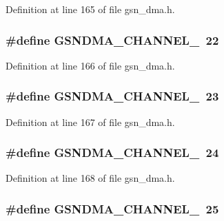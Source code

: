 Definition at line 165 of file gsn\_\-dma.h.

\hypertarget{a00484_a95f0b82527fdf9419ba78afedde7606f}{
\subsubsection[{GSNDMA\_\-CHANNEL\_\-22}]{\setlength{\rightskip}{0pt plus 5cm}\#define GSNDMA\_\-CHANNEL\_~22}}
\label{a00484_a95f0b82527fdf9419ba78afedde7606f}


Definition at line 166 of file gsn\_\-dma.h.

\hypertarget{a00484_abd4020cf11e9fb4f581ae3ed06b26f38}{
\subsubsection[{GSNDMA\_\-CHANNEL\_\-23}]{\setlength{\rightskip}{0pt plus 5cm}\#define GSNDMA\_\-CHANNEL\_~23}}
\label{a00484_abd4020cf11e9fb4f581ae3ed06b26f38}


Definition at line 167 of file gsn\_\-dma.h.

\hypertarget{a00484_a2716f45e9773e71249d1da5033e11363}{
\subsubsection[{GSNDMA\_\-CHANNEL\_\-24}]{\setlength{\rightskip}{0pt plus 5cm}\#define GSNDMA\_\-CHANNEL\_~24}}
\label{a00484_a2716f45e9773e71249d1da5033e11363}


Definition at line 168 of file gsn\_\-dma.h.

\hypertarget{a00484_a3750b075005d49e145662b326d46e114}{
\subsubsection[{GSNDMA\_\-CHANNEL\_\-25}]{\setlength{\rightskip}{0pt plus 5cm}\#define GSNDMA\_\-CHANNEL\_~25}}
\label{a00484_a3750b075005d49e145662b326d46e114}


